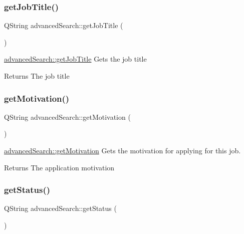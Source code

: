 \subsubsection{\texorpdfstring{getJobTitle()}{getJobTitle()}}
{\footnotesize\ttfamily Q\+String advanced\+Search\+::get\+Job\+Title (\begin{DoxyParamCaption}{ }\end{DoxyParamCaption})}



\mbox{\hyperlink{classadvanced_search_a7bcbaf1e2663396daacf9b033c34238a}{advanced\+Search\+::get\+Job\+Title}} Gets the job title 

\begin{DoxyReturn}{Returns}
The job title 
\end{DoxyReturn}
\mbox{\label{classadvanced_search_a40af6df4af92bc7f4cff89729df2c6da}} 
\subsubsection{\texorpdfstring{getMotivation()}{getMotivation()}}
{\footnotesize\ttfamily Q\+String advanced\+Search\+::get\+Motivation (\begin{DoxyParamCaption}{ }\end{DoxyParamCaption})}



\mbox{\hyperlink{classadvanced_search_a40af6df4af92bc7f4cff89729df2c6da}{advanced\+Search\+::get\+Motivation}} Gets the motivation for applying for this job. 

\begin{DoxyReturn}{Returns}
The application motivation 
\end{DoxyReturn}
\mbox{\label{classadvanced_search_afc318495c6475695844bd0f22c6c1e3c}} 
\subsubsection{\texorpdfstring{getStatus()}{getStatus()}}
{\footnotesize\ttfamily Q\+String advanced\+Search\+::get\+Status (\begin{DoxyParamCaption}{ }\end{DoxyParamCaption})}



